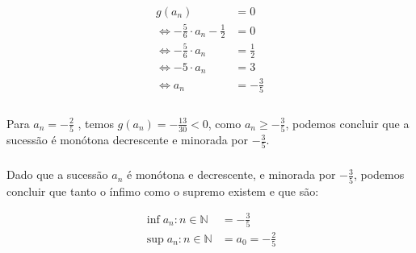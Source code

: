 \begin{align*}
	g(a_n) &= 0\\
	\iff -\frac{5}{6} \cdot a_n - \frac{1}{2} &= 0\\
	\iff -\frac{5}{6} \cdot a_n  &= \frac{1}{2}\\
	\iff -5 \cdot a_n  &= 3\\
	\iff a_n  &= -\frac{3}{5}\\
\end{align*}

\paragraph{} Para $a_n = -\frac{2}{5}$ , temos $g(a_n) = -\frac{13}{30} < 0$,
como $a_n \geq -\frac{3}{5}$, podemos concluir que a sucessão é monótona
decrescente e minorada por $-\frac{3}{5}$.

\newpage

\subsubsection{}

\paragraph{} Dado que a sucessão $a_n$ é monótona e decrescente, e minorada
por $-\frac{3}{5}$, podemos concluir que tanto o ínfimo como o supremo existem
e que são:

\begin{align*}
	\inf{a_n : n \in \mathbb{N}} &= -\frac{3}{5}\\
	\sup{a_n : n \in \mathbb{N}} &= a_0 = -\frac{2}{5}
\end{align*}
